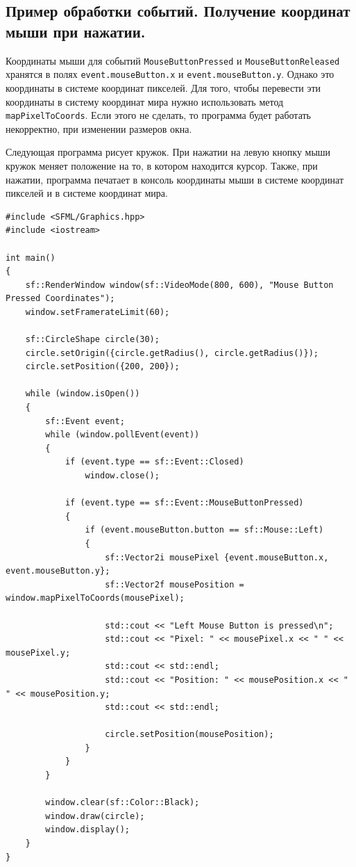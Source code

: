 \documentclass{article}
\begin{document}
\newpage
\subsection*{Пример обработки событий. Получение координат мыши при нажатии.}
Координаты мыши для событий \texttt{MouseButtonPressed} и \texttt{MouseButtonReleased} хранятся в полях \texttt{event.mouseButton.x} и \texttt{event.mouseButton.y}. Однако это координаты в системе координат пикселей. Для того, чтобы перевести эти координаты в систему координат мира нужно использовать метод \texttt{mapPixelToCoords}. Если этого не сделать, то программа будет работать некорректно, при изменении размеров окна.

Следующая программа рисует кружок. При нажатии на левую кнопку мыши кружок меняет положение на то, в котором находится курсор. Также, при нажатии, программа печатает в консоль координаты мыши в системе координат пикселей и в системе координат мира.
\begin{lstlisting}
#include <SFML/Graphics.hpp>
#include <iostream>

int main()
{
    sf::RenderWindow window(sf::VideoMode(800, 600), "Mouse Button Pressed Coordinates");
    window.setFramerateLimit(60);

    sf::CircleShape circle(30);
    circle.setOrigin({circle.getRadius(), circle.getRadius()});
    circle.setPosition({200, 200});

    while (window.isOpen()) 
    {
        sf::Event event;
        while (window.pollEvent(event)) 
        {
            if (event.type == sf::Event::Closed)
                window.close();

            if (event.type == sf::Event::MouseButtonPressed)
            {
                if (event.mouseButton.button == sf::Mouse::Left)
                {
                    sf::Vector2i mousePixel {event.mouseButton.x, event.mouseButton.y};
                    sf::Vector2f mousePosition = window.mapPixelToCoords(mousePixel);

                    std::cout << "Left Mouse Button is pressed\n";
                    std::cout << "Pixel: " << mousePixel.x << " " << mousePixel.y;
                    std::cout << std::endl;
                    std::cout << "Position: " << mousePosition.x << " " << mousePosition.y;
                    std::cout << std::endl;

                    circle.setPosition(mousePosition);
                }
            }
        }

        window.clear(sf::Color::Black);
        window.draw(circle);
        window.display();
    }
}
\end{lstlisting}
\end{document}
